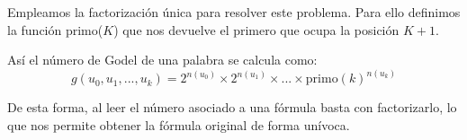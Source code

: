 Empleamos la factorización única para resolver este problema. Para ello definimos la función primo($K$) que nos devuelve el primero que ocupa la posición $K+1$.

Así el número de Godel de una palabra se calcula como:
\[g(u_0,u_1,...,u_k)=2^{n(u_0)}\times 2^{n(u_1)}\times ... \times \text{primo}(k)^{n(u_k)}\]

De esta forma, al leer el número asociado a una fórmula basta con factorizarlo, lo que nos permite obtener la fórmula original de forma unívoca.


